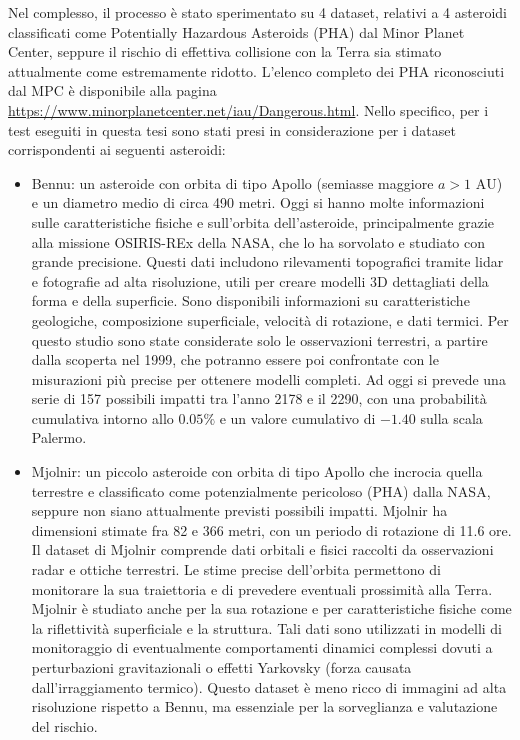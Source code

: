 \documentclass[12pt,a4paper,openright,twoside]{book}
\begin{document}
Nel complesso, il processo è stato sperimentato su 4 dataset, relativi a 4 asteroidi classificati come Potentially Hazardous Asteroids (PHA) dal Minor Planet Center, seppure il rischio di effettiva collisione con la Terra sia stimato attualmente come estremamente ridotto. L'elenco completo dei PHA riconosciuti dal MPC è disponibile alla pagina \url{https://www.minorplanetcenter.net/iau/Dangerous.html}. Nello specifico, per i test eseguiti in questa tesi sono stati presi in considerazione per i dataset corrispondenti ai seguenti asteroidi:
\begin{itemize}
\item Bennu: un asteroide con orbita di tipo Apollo (semiasse maggiore $a>1\text{ AU}$) e un diametro medio di circa 490 metri. Oggi si hanno molte informazioni sulle caratteristiche fisiche e sull'orbita dell'asteroide, principalmente grazie alla missione OSIRIS-REx della NASA, che lo ha sorvolato e studiato con grande precisione. Questi dati includono rilevamenti topografici tramite lidar e fotografie ad alta risoluzione, utili per creare modelli 3D dettagliati della forma e della superficie. Sono disponibili informazioni su caratteristiche geologiche, composizione superficiale, velocità di rotazione, e dati termici. Per questo studio sono state considerate solo le osservazioni terrestri, a partire dalla scoperta nel 1999, che potranno essere poi confrontate con le misurazioni più precise per ottenere modelli completi. Ad oggi si prevede una serie di 157 possibili impatti tra l'anno 2178 e il 2290, con una probabilità cumulativa intorno allo $0.05\%$ e un valore cumulativo di $-1.40$ sulla scala Palermo.

\item Mjolnir: un piccolo asteroide con orbita di tipo Apollo che incrocia quella terrestre e classificato come potenzialmente pericoloso (PHA) dalla NASA, seppure non siano attualmente previsti possibili impatti. Mjolnir ha dimensioni stimate fra 82 e 366 metri, con un periodo di rotazione di 11.6 ore. Il dataset di Mjolnir comprende dati orbitali e fisici raccolti da osservazioni radar e ottiche terrestri. Le stime precise dell'orbita permettono di monitorare la sua traiettoria e di prevedere eventuali prossimità alla Terra. Mjolnir è studiato anche per la sua rotazione e per caratteristiche fisiche come la riflettività superficiale e la struttura. Tali dati sono utilizzati in modelli di monitoraggio di eventualmente comportamenti dinamici complessi dovuti a perturbazioni gravitazionali o effetti Yarkovsky (forza causata dall'irraggiamento termico). Questo dataset è meno ricco di immagini ad alta risoluzione rispetto a Bennu, ma essenziale per la sorveglianza e valutazione del rischio.


\end{itemize}
\end{document}
